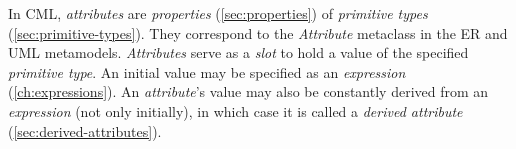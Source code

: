 \begin{definition}
In CML, \emph{attributes} are \emph{properties} (\ref{sec:properties})
of \emph{primitive types} (\ref{sec:primitive-types}).
They correspond to the \emph{Attribute} metaclass 
in the ER \cite{er} and UML \cite{uml} metamodels.
\emph{Attributes} serve as a \emph{slot} to hold a value of 
the specified \emph{primitive type}.
An initial value may be specified as an \emph{expression} (\ref{ch:expressions}).
An \emph{attribute}'s value may also be constantly
derived from an \emph{expression} (not only initially),
in which case it is called a \emph{derived attribute} (\ref{sec:derived-attributes}).
\end{definition}
